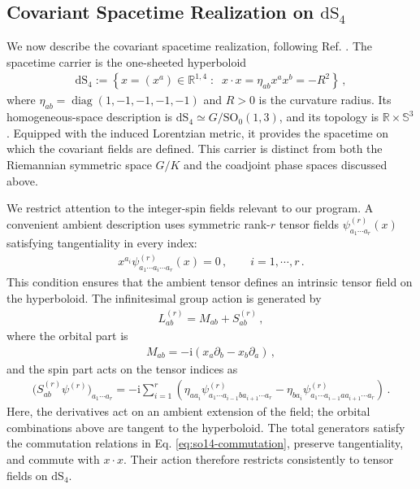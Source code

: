 \documentclass{SciPost}
\begin{document}
\subsection{Covariant Spacetime Realization on $\mathrm{dS}_{4}$} \label{subsec:noncompact-realization}

We now describe the covariant spacetime realization, following Ref. \cite{Gazeau2024}. The spacetime carrier is the one-sheeted hyperboloid
\begin{align} \label{eq:dS-hyperboloid}
    \mathrm{dS}_{4}
    :=
    \left\{
        x=(x^a)\in\mathbb R^{1,4}
        \;\colon\;\;
        x\cdot x=\eta_{ab}x^ax^b=-R^2
    \right\} \,,
\end{align}
where $\eta_{ab}=\operatorname{diag}(1,-1,-1,-1,-1)$ and $R>0$ is the curvature radius. Its homogeneous-space description is $\mathrm{dS}_{4}\simeq G/\mathrm{SO}_0(1,3)$, and its topology is $\mathbb R\times\mathbb S^3$. Equipped with the induced Lorentzian metric, it provides the spacetime on which the covariant fields are defined. This carrier is distinct from both the Riemannian symmetric space $G/K$ and the coadjoint phase spaces discussed above.

We restrict attention to the integer-spin fields relevant to our program. A convenient ambient description uses symmetric rank-$r$ tensor fields $\psi^{(r)}_{a_1\cdots a_r}(x)$ satisfying tangentiality in every index:
\begin{align}
    x^{a_i}\psi^{(r)}_{a_1\cdots a_i\cdots a_r}(x)=0
    \,, \qquad i=1,\cdots,r \,.
\end{align}
This condition ensures that the ambient tensor defines an intrinsic tensor field on the hyperboloid. The infinitesimal group action is generated by
\begin{align} \label{eq:ambient-generators}
    L^{(r)}_{ab}=M^{}_{ab}+S^{(r)}_{ab} \,,
\end{align}
where the orbital part is
\begin{align}
    M_{ab}
    =
    -\mathrm{i}\left(x_a\partial_b-x_b\partial_a\right) \,,
\end{align}
and the spin part acts on the tensor indices as
\begin{align}
    \bigl(S^{(r)}_{ab}\psi^{(r)}\bigr)_{a_1\cdots a_r}
    =
    -\mathrm{i}\sum_{i=1}^{r}
    \left(
        \eta_{aa_i}
        \psi^{(r)}_{a_1\cdots a_{i-1}b a_{i+1}\cdots a_r}
        -
        \eta_{ba_i}
        \psi^{(r)}_{a_1\cdots a_{i-1}a a_{i+1}\cdots a_r}
    \right) \,.
\end{align}
Here, the derivatives act on an ambient extension of the field; the orbital combinations above are tangent to the hyperboloid. The total generators satisfy the commutation relations in Eq. \eqref{eq:so14-commutation}, preserve tangentiality, and commute with $x\cdot x$. Their action therefore restricts consistently to tensor fields on $\mathrm{dS}_{4}$.
\end{document}
